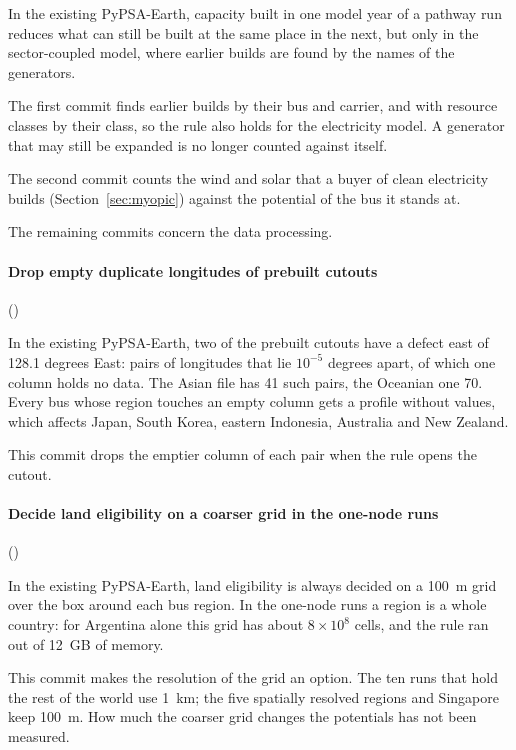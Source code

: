 In the existing PyPSA-Earth, capacity built in one model year of a pathway run reduces what can still be built at the same place in the next, but only in the sector-coupled model, where earlier builds are found by the names of the generators.

The first commit finds earlier builds by their bus and carrier, and with resource classes by their class, so the rule also holds for the electricity model.
A generator that may still be expanded is no longer counted against itself.

The second commit counts the wind and solar that a buyer of clean electricity builds (Section~\ref{sec:myopic}) against the potential of the bus it stands at.

The remaining commits concern the data processing.

\paragraph{Drop empty duplicate longitudes of prebuilt cutouts} ()

In the existing PyPSA-Earth, two of the prebuilt cutouts have a defect east of 128.1 degrees East: pairs of longitudes that lie $10^{-5}$ degrees apart, of which one column holds no data.
The Asian file has 41 such pairs, the Oceanian one 70.
Every bus whose region touches an empty column gets a profile without values, which affects Japan, South Korea, eastern Indonesia, Australia and New Zealand.

This commit drops the emptier column of each pair when the rule opens the cutout.

\paragraph{Decide land eligibility on a coarser grid in the one-node runs} ()

In the existing PyPSA-Earth, land eligibility is always decided on a \SI{100}{m} grid over the box around each bus region.
In the one-node runs a region is a whole country: for Argentina alone this grid has about $8\times10^{8}$ cells, and the rule ran out of \SI{12}{GB} of memory.

This commit makes the resolution of the grid an option.
The ten runs that hold the rest of the world use \SI{1}{km}; the five spatially resolved regions and Singapore keep \SI{100}{m}.
How much the coarser grid changes the potentials has not been measured.

